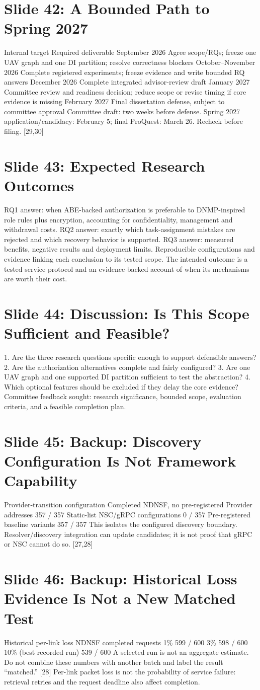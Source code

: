 \documentclass[11pt]{article}
\newcommand{\slideentry}[3]{\section*{Slide #1: #2}#3\par}
\begin{document}
\slideentry{42}{A Bounded Path to Spring 2027}{
Internal target Required deliverable September 2026 Agree scope/RQs; freeze one UAV graph and one DI partition; resolve correctness blockers October--November 2026 Complete registered experiments; freeze evidence and write bounded RQ answers December 2026 Complete integrated advisor-review draft January 2027 Committee review and readiness decision; reduce scope or revise timing if core evidence is missing February 2027 Final dissertation defense, subject to committee approval Committee draft: two weeks before defense. Spring 2027 application/candidacy: February 5; final ProQuest: March 26. Recheck before filing. [29,30]
}
\slideentry{43}{Expected Research Outcomes}{
RQ1 answer: when ABE-backed authorization is preferable to DNMP-inspired role rules plus encryption, accounting for confidentiality, management and withdrawal costs. RQ2 answer: exactly which task-assignment mistakes are rejected and which recovery behavior is supported. RQ3 answer: measured benefits, negative results and deployment limits. Reproducible configurations and evidence linking each conclusion to its tested scope. The intended outcome is a tested service protocol and an evidence-backed account of when its mechanisms are worth their cost.
}
\slideentry{44}{Discussion: Is This Scope Sufficient and Feasible?}{
1. Are the three research questions specific enough to support defensible answers? 2. Are the authorization alternatives complete and fairly configured? 3. Are one UAV graph and one supported DI partition sufficient to test the abstraction? 4. Which optional features should be excluded if they delay the core evidence? Committee feedback sought: research significance, bounded scope, evaluation criteria, and a feasible completion plan.
}
\slideentry{45}{Backup: Discovery Configuration Is Not Framework Capability}{
Provider-transition configuration Completed NDNSF, no pre-registered Provider addresses 357 / 357 Static-list NSC/gRPC configurations 0 / 357 Pre-registered baseline variants 357 / 357 This isolates the configured discovery boundary. Resolver/discovery integration can update candidates; it is not proof that gRPC or NSC cannot do so. [27,28]
}
\slideentry{46}{Backup: Historical Loss Evidence Is Not a New Matched Test}{
Historical per-link loss NDNSF completed requests 1\% 599 / 600 3\% 598 / 600 10\% (best recorded run) 539 / 600 A selected run is not an aggregate estimate. Do not combine these numbers with another batch and label the result “matched.” [28] Per-link packet loss is not the probability of service failure: retrieval retries and the request deadline also affect completion.
}
\end{document}
